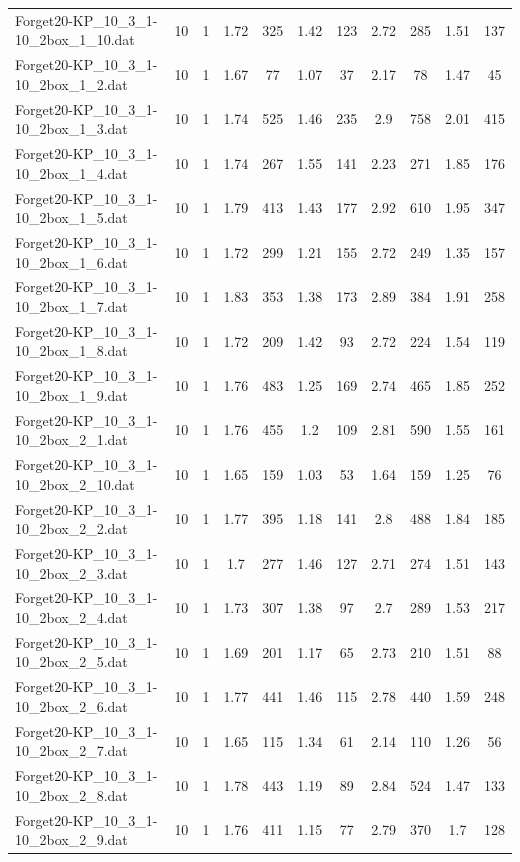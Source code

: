 \begin{table}[!ht]
\begin{tabular}{lcccccccccc}
Forget20-KP\_10\_3\_1-10\_2box\_1\_10.dat & 10 & 1 & 1.72 & 325 & 1.42 & 123 & 2.72 & 285 & 1.51 & 137 \\
Forget20-KP\_10\_3\_1-10\_2box\_1\_2.dat & 10 & 1 & 1.67 & 77 & 1.07 & 37 & 2.17 & 78 & 1.47 & 45 \\
Forget20-KP\_10\_3\_1-10\_2box\_1\_3.dat & 10 & 1 & 1.74 & 525 & 1.46 & 235 & 2.9 & 758 & 2.01 & 415 \\
Forget20-KP\_10\_3\_1-10\_2box\_1\_4.dat & 10 & 1 & 1.74 & 267 & 1.55 & 141 & 2.23 & 271 & 1.85 & 176 \\
Forget20-KP\_10\_3\_1-10\_2box\_1\_5.dat & 10 & 1 & 1.79 & 413 & 1.43 & 177 & 2.92 & 610 & 1.95 & 347 \\
Forget20-KP\_10\_3\_1-10\_2box\_1\_6.dat & 10 & 1 & 1.72 & 299 & 1.21 & 155 & 2.72 & 249 & 1.35 & 157 \\
Forget20-KP\_10\_3\_1-10\_2box\_1\_7.dat & 10 & 1 & 1.83 & 353 & 1.38 & 173 & 2.89 & 384 & 1.91 & 258 \\
Forget20-KP\_10\_3\_1-10\_2box\_1\_8.dat & 10 & 1 & 1.72 & 209 & 1.42 & 93 & 2.72 & 224 & 1.54 & 119 \\
Forget20-KP\_10\_3\_1-10\_2box\_1\_9.dat & 10 & 1 & 1.76 & 483 & 1.25 & 169 & 2.74 & 465 & 1.85 & 252 \\
Forget20-KP\_10\_3\_1-10\_2box\_2\_1.dat & 10 & 1 & 1.76 & 455 & 1.2 & 109 & 2.81 & 590 & 1.55 & 161 \\
Forget20-KP\_10\_3\_1-10\_2box\_2\_10.dat & 10 & 1 & 1.65 & 159 & 1.03 & 53 & 1.64 & 159 & 1.25 & 76 \\
Forget20-KP\_10\_3\_1-10\_2box\_2\_2.dat & 10 & 1 & 1.77 & 395 & 1.18 & 141 & 2.8 & 488 & 1.84 & 185 \\
Forget20-KP\_10\_3\_1-10\_2box\_2\_3.dat & 10 & 1 & 1.7 & 277 & 1.46 & 127 & 2.71 & 274 & 1.51 & 143 \\
Forget20-KP\_10\_3\_1-10\_2box\_2\_4.dat & 10 & 1 & 1.73 & 307 & 1.38 & 97 & 2.7 & 289 & 1.53 & 217 \\
Forget20-KP\_10\_3\_1-10\_2box\_2\_5.dat & 10 & 1 & 1.69 & 201 & 1.17 & 65 & 2.73 & 210 & 1.51 & 88 \\
Forget20-KP\_10\_3\_1-10\_2box\_2\_6.dat & 10 & 1 & 1.77 & 441 & 1.46 & 115 & 2.78 & 440 & 1.59 & 248 \\
Forget20-KP\_10\_3\_1-10\_2box\_2\_7.dat & 10 & 1 & 1.65 & 115 & 1.34 & 61 & 2.14 & 110 & 1.26 & 56 \\
Forget20-KP\_10\_3\_1-10\_2box\_2\_8.dat & 10 & 1 & 1.78 & 443 & 1.19 & 89 & 2.84 & 524 & 1.47 & 133 \\
Forget20-KP\_10\_3\_1-10\_2box\_2\_9.dat & 10 & 1 & 1.76 & 411 & 1.15 & 77 & 2.79 & 370 & 1.7 & 128 \\

\end{tabular}
\end{table}
